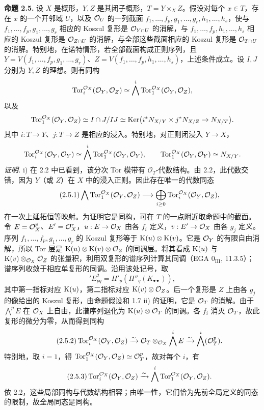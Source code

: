 \textbf{命题 2.5.} 设 \(X\) 是概形，\(Y,Z\) 是其闭子概形，\(T=Y\times_XZ\)。假设对每个 \(x\in T\)，存在 \(x\) 的一个开邻域 \(U\)，以及 \(\mathcal O_U\) 的一列截面 \(f_1,\ldots,f_p,g_1,\ldots,g_r,h_1,\ldots,h_s\)，使与 \(f_1,\ldots,f_p,g_1,\ldots,g_r\) 相应的 Koszul 复形是 \(\mathcal O_{Y\cap U}\) 的消解，与 \(f_1,\ldots,f_p,h_1,\ldots,h_s\) 相应的 Koszul 复形是 \(\mathcal O_{Z\cap U}\) 的消解，与全部这些截面相应的 Koszul 复形是 \(\mathcal O_{T\cap U}\) 的消解。特别地，在诺特情形，若全部截面构成正则序列，且 \(Y=V(f_1,\ldots,f_p,g_1,\ldots,g_r)\)、\(Z=V(f_1,\ldots,f_p,h_1,\ldots,h_s)\)，上述条件成立。设 \(I,J\) 分别为 \(Y,Z\) 的理想。则有同构
\[
\operatorname{Tor}_i^{\mathcal O_X}(\mathcal O_Y,\mathcal O_Z)\simeq \bigwedge^i\operatorname{Tor}_1^{\mathcal O_X}(\mathcal O_Y,\mathcal O_Z),
\]
以及
\[
\operatorname{Tor}_1^{\mathcal O_X}(\mathcal O_Y,\mathcal O_Z)
\simeq I\cap J/IJ
\simeq \operatorname{Ker}\bigl(i^*N_{X/Y}\times j^*N_{X/Z}\to N_{X/T}\bigr).
\]
其中 \(i:T\to Y\)、\(j:T\to Z\) 是相应的浸入。特别地，对正则闭浸入 \(Y\to X\)，
\[
\operatorname{Tor}_i^{\mathcal O_X}(\mathcal O_Y,\mathcal O_Y)\simeq
\bigwedge^i\operatorname{Tor}_1^{\mathcal O_X}(\mathcal O_Y,\mathcal O_Y),
\qquad
\operatorname{Tor}_1^{\mathcal O_X}(\mathcal O_Y,\mathcal O_Y)\simeq N_{X/Y}.
\]
\emph{证明.} i) 在 2.2 中已看到，该分次 Tor 模带有 \(\mathcal O_T\)-代数结构。由 2.2，此代数交错，因为 \(Y\)（或 \(Z\)）在 \(X\) 中的浸入正则。因此存在唯一的代数同态
\begin{equation}\tag{2.5.1}
 \bigwedge\operatorname{Tor}_1^{\mathcal O_X}(\mathcal O_Y,\mathcal O_Z)
 \longrightarrow\bigoplus_{i\geq0}\operatorname{Tor}_i^{\mathcal O_X}(\mathcal O_Y,\mathcal O_Z),
\end{equation}
在一次上延拓恒等映射。为证明它是同构，可在 \(T\) 的一点附近取命题中的截面。令 \(E=\mathcal O_X^p\)、\(E'=\mathcal O_X^r\)，\(u:E\to\mathcal O_X\) 由各 \(f_i\) 定义，\(v:E'\to\mathcal O_X\) 由各 \(g_j\) 定义。序列 \(f_1,\ldots,f_p,g_1,\ldots,g_r\) 的 Koszul 复形等于 \(\mathrm K(u)\otimes\mathrm K(v)\)。它是 \(\mathcal O_Y\) 的有限自由消解，所以 Tor 层是 \(\mathrm K(u)\otimes\mathrm K(v)\otimes\mathcal O_Z\) 的同调层。将其看成 \(\mathrm K(u)\) 与 \(\mathrm K(v)\otimes_{\mathcal O_X}\mathcal O_Z\) 的张量积，利用双复形的谱序列计算其同调（EGA \(0_{\mathrm{III}}\), 11.3.5）；谱序列收敛于相应单复形的同调。沿用该处记号，取
\[
 {}'E^2_{pq}=H'_p(H''_q(K_{\bullet\bullet})),
\]
其中第一指标对应 \(\mathrm K(u)\)，第二指标对应 \(\mathrm K(v)\otimes\mathcal O_Z\)。后一个复形是 \(Z\) 上由各 \(g_j\) 的像给出的 Koszul 复形，由命题假设和 1.7 ii) 的证明，它是 \(\mathcal O_T\) 的消解。由于 \(\bigwedge^pE\) 在 \(\mathcal O_X\) 上自由，此谱序列退化为 \(\mathrm K(u)\otimes\mathcal O_T\) 的同调。各 \(f_i\) 消灭 \(\mathcal O_T\)，故此复形的微分为零，从而得到同构
\begin{equation}\tag{2.5.2}
 \operatorname{Tor}_i^{\mathcal O_X}(\mathcal O_Y,\mathcal O_Z)
 \xrightarrow{\sim}\mathcal O_T\otimes_{\mathcal O_X}\bigwedge^iE
 \xrightarrow{\sim}\bigwedge^i(\mathcal O_T^p).
\end{equation}
特别地，取 \(i=1\)，得 \(\operatorname{Tor}_1^{\mathcal O_X}(\mathcal O_Y,\mathcal O_Z)\simeq\mathcal O_T^p\)，故对每个 \(i\)，有
\begin{equation}\tag{2.5.3}
 \operatorname{Tor}_i^{\mathcal O_X}(\mathcal O_Y,\mathcal O_Z)
 \xrightarrow{\sim}\bigwedge^i\operatorname{Tor}_1^{\mathcal O_X}(\mathcal O_Y,\mathcal O_Z).
\end{equation}依 2.2，这些局部同构与代数结构相容；由唯一性，它们恰为先前全局定义的同态的限制，故全局同态是同构。

